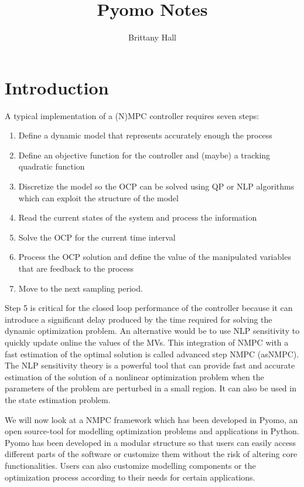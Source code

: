\documentclass{article}
\title{Pyomo Notes}
\author{Brittany Hall}
\date{}
\begin{document}
	\maketitle
\section{Introduction}
A typical implementation of a (N)MPC controller requires seven steps:
\begin{enumerate}
	\item Define a dynamic model that represents accurately enough the process
	\item Define an objective function for the controller and (maybe) a tracking quadratic function 
	\item Discretize the model so the OCP can be solved using QP or NLP algorithms which can exploit the structure of the model
	\item Read the current states of the system and process the information
	\item Solve the OCP for the current time interval
	\item Process the OCP solution and define the value of the manipulated variables that are feedback to the process
	\item Move to the next sampling period.
\end{enumerate}
Step 5 is critical for the closed loop performance of the controller because it can introduce a significant delay produced by the time required for solving the dynamic optimization problem.
An alternative would be to use NLP sensitivity to quickly update online the values of the MVs.
This integration of NMPC with a fast estimation of the optimal solution is called advanced step NMPC (asNMPC).
The NLP sensitivity theory is a powerful tool that can provide fast and accurate estimation of the solution of a nonlinear optimization problem when the parameters of the problem are perturbed in a small region.
It can also be used in the state estimation problem.
\par
We will now look at a NMPC framework which has been developed in Pyomo, an open source-tool for modelling optimization problems and applications in Python.
Pyomo has been developed in a modular structure so that users can easily access different parts of the software or customize them without the risk of altering core functionalities.
Users can also customize modelling components or the optimization process according to their needs for certain applications.
\end{document}
